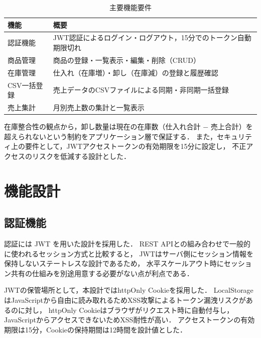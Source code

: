 \documentclass[submit,techrep]{ipsj}
\begin{document}
\begin{table}[htb]
  \caption{主要機能要件}
  \label{tab:requirements}
  \vspace{2mm}
  \centering
  \small
  \begin{tabular}{lp{55mm}}
    \hline\hline
    \textbf{機能} & \textbf{概要} \\
    \hline
    認証機能     & JWT認証によるログイン・ログアウト，15分でのトークン自動期限切れ \\
    商品管理     & 商品の登録・一覧表示・編集・削除（CRUD） \\
    在庫管理     & 仕入れ（在庫増）・卸し（在庫減）の登録と履歴確認 \\
    CSV一括登録  & 売上データのCSVファイルによる同期・非同期一括登録 \\
    売上集計     & 月別売上数の集計と一覧表示 \\
    \hline
  \end{tabular}
\end{table}

在庫整合性の観点から，卸し数量は現在の在庫数（仕入れ合計 $-$ 売上合計）を
超えられないという制約をアプリケーション層で保証する．
また，セキュリティ上の要件として，JWTアクセストークンの有効期限を15分に設定し，
不正アクセスのリスクを低減する設計とした\cite{owasp-authn}．

\section{機能設計}

\subsection{認証機能}

認証には JWT\cite{rfc7519} を用いた設計を採用した．
REST APIとの組み合わせで一般的に使われるセッション方式と比較すると，
JWTはサーバ側にセッション情報を保持しないステートレスな設計であるため，
水平スケールアウト時にセッション共有の仕組みを別途用意する必要がない点が利点である．

JWTの保管場所として，本設計ではhttpOnly Cookieを採用した．
LocalStorageはJavaScriptから自由に読み取れるためXSS攻撃によるトークン漏洩リスクがある\cite{owasp-session}のに対し，
httpOnly Cookieはブラウザがリクエスト時に自動付与し，JavaScriptからアクセスできないためXSS耐性が高い．
アクセストークンの有効期限は15分，Cookieの保持期間は12時間を設計値とした．
\end{document}
